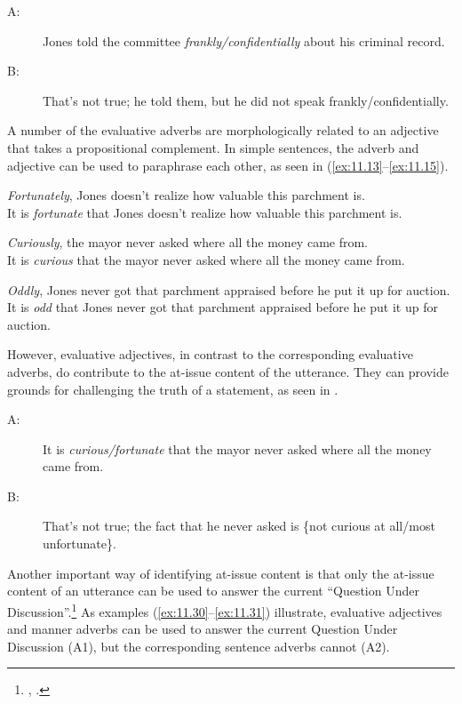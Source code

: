 \ea \label{ex:11.10}
\begin{description}
\item[A:] Jones told the committee \textit{frankly/confidentially} about his criminal record.\\
\item[B:] That’s not true; he told them, but he did not speak frankly/confidentially.
\end{description}
\z


A number of the evaluative adverbs are morphologically related to an adjective that takes a propositional complement. In simple sentences, the adverb and adjective can be used to paraphrase each other, as seen in (\ref{ex:11.13}--\ref{ex:11.15}).


\ea \label{ex:11.13}
\ea \textit{Fortunately}, Jones doesn’t realize how valuable this parchment is.\\
\ex It is \textit{fortunate} that Jones doesn’t realize how valuable this parchment is.
                       \z
\z

\ea \label{ex:11.14}
\ea \textit{Curiously}, the mayor never asked where all the money came from.\\
\ex It is \textit{curious} that the mayor never asked where all the money came from.
\z \z

\ea \label{ex:11.15}
\ea \textit{Oddly}, Jones never got that parchment appraised before he put it up for auction.\\
\ex It is \textit{odd} that Jones never got that parchment appraised before he put it up for auction.
                       \z
\z


However, evaluative adjectives, in contrast to the corresponding evaluative adverbs, do contribute to the at-issue content of the utterance. They can provide grounds for challenging the truth of a statement, as seen in .


\ea \label{ex:11.16}
\begin{description}
\item[A:] It is \textit{curious/fortunate} that the mayor never asked where all the money came from.\\
\item[B:] That’s not true; the fact that he never asked is \{not curious at all/most unfortunate\}.
\end{description}
\z


Another important way of identifying at-issue content is that only the at-issue content of an utterance can be used to answer the current “Question Under Discussion”.\footnote{\citet{Roberts1996}, \citet{Ginzburg1996}.}  As examples (\ref{ex:11.30}--\ref{ex:11.31}) illustrate, evaluative adjectives and manner adverbs can be used to answer the current Question Under Discussion (A1), but the corresponding sentence adverbs cannot (A2).


